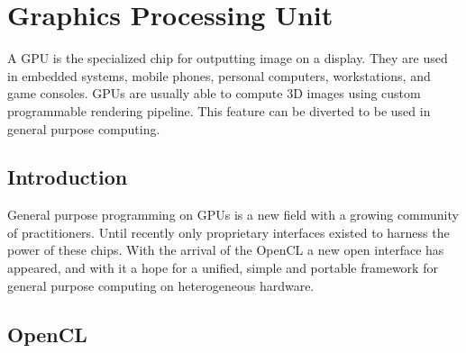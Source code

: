 %

\chapter{Graphics Processing Unit}

A \gls{GPU} is the specialized chip for outputting image on a display. They are used in embedded systems, mobile phones, personal computers, workstations, and game consoles. \Glspl{GPU} are usually able to compute 3D images using custom programmable rendering pipeline. This feature can be diverted to be used in general purpose computing.

\section{Introduction}

General purpose programming on \glspl{GPU} is a new field with a growing community of practitioners. Until recently only proprietary interfaces existed to harness the power of these chips. With the arrival of the \gls{OpenCL} a new open interface has appeared, and with it a hope for a unified, simple and portable framework for general purpose computing on heterogeneous hardware.

\section{OpenCL}

